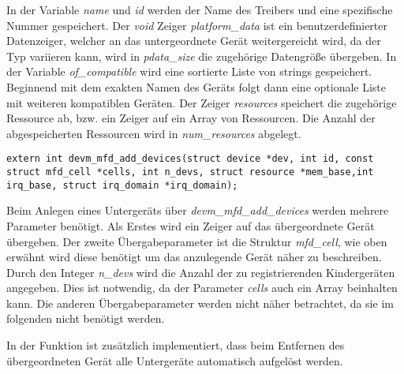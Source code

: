 In der Variable \textit{name} und \textit{id} werden der Name des Treibers und eine spezifische Nummer gespeichert.
Der \textit{void} Zeiger \textit{platform\_data} ist ein benutzerdefinierter Datenzeiger, welcher an das untergeordnete Gerät weitergereicht wird, da der Typ variieren kann, wird in \textit{pdata\_size} die zugehörige Datengröße übergeben. 
In der Variable \textit{of\_compatible} wird eine sortierte Liste von strings gespeichert. Beginnend mit dem exakten Namen des Geräts folgt dann eine optionale Liste mit weiteren kompatiblen Geräten. \cite[devicetree/usage\_model.txt, Zeile 116ff.]{linuxsourcedocu} %
Der Zeiger \textit{resources} speichert die zugehörige Ressource ab, bzw. ein Zeiger auf ein Array von Ressourcen. Die Anzahl der abgespeicherten Ressourcen wird in \textit{num\_resources} abgelegt.\\

\begin{lstfloat}
\begin{lstlisting}
extern int devm_mfd_add_devices(struct device *dev, int id, const struct mfd_cell *cells, int n_devs, struct resource *mem_base,int irq_base, struct irq_domain *irq_domain);
\end{lstlisting}
\end{lstfloat}

Beim Anlegen eines Untergeräts über \textit{devm\_mfd\_add\_devices} werden mehrere Parameter benötigt. 
Als Erstes wird ein Zeiger auf das übergeordnete Gerät übergeben. Der zweite Übergabeparameter ist die Struktur \textit{mfd\_cell}, wie oben erwähnt wird diese benötigt um das anzulegende Gerät näher zu beschreiben.
Durch den Integer \textit{n\_devs} wird die Anzahl der zu registrierenden Kindergeräten angegeben. Dies ist notwendig, da der Parameter \textit{cells} auch ein Array beinhalten kann. 
Die anderen Übergabeparameter werden nicht näher betrachtet, da sie im folgenden nicht benötigt werden. \cite[mfd/mfd-core.c, Zeile 359ff.]{linuxsourcedriver} %


In der Funktion ist zusätzlich implementiert, dass beim Entfernen des übergeordneten Gerät alle Untergeräte automatisch aufgelöst werden. \cite[mfd/mfd-core.c, Zeile 356f.]{linuxsourcedriver}%



